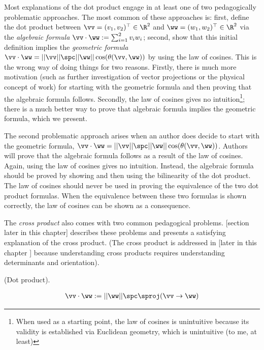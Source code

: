 Most explanations of the dot product engage in at least one of two pedagogically problematic approaches. The most common of these approaches is: first, define the dot product between $\vv = (v_1, v_2)^\top \in \R^2$ and $\ww = (w_1, w_2)^\top \in \R^2$ via the \textit{algebraic formula} $\vv \cdot \ww := \sum_{i = 1}^2 v_i w_i$;
second, show that this initial definition implies the \textit{geometric formula} $\vv \cdot \ww = ||\vv|| \spc ||\ww|| \cos(\theta(\vv, \ww))$ by using the law of cosines. This is the wrong way of doing things for two reasons. Firstly, there is much more motivation (such as further investigation of vector projections or the physical concept of work) for starting with the geometric formula and then proving that the algebraic formula follows. Secondly, the law of cosines gives no intuition\footnote{When used as a starting point, the law of cosines is unintuitive because its validity is established via Euclidean geometry, which is unintuitive (to me, at least)}; there is a much better way to prove that algebraic formula implies the geometric formula, which we present.

The second problematic approach arises when an author does decide to start with the geometric formula, $\vv \cdot \ww = ||\vv|| \spc ||\ww|| \cos(\theta(\vv, \ww))$. Authors will prove that the algebraic formula follows as a result of the law of cosines. Again, using the law of cosines gives no intuition. Instead, the algebraic formula should be proved by showing and then using the bilinearity of the dot product. The law of cosines should never
be used in proving the equivalence of the two dot product formulas. When the equivalence between these two formulas is shown correctly, the law of cosines can be shown as a consequence.

\vspace{.25cm}

The \textit{cross product} also comes with two common pedagogical problems. [section later in this chapter] describes these problems and presents a satisfying explanation of the cross product. (The cross product is addressed in [later in this chapter ] because understanding cross products requires understanding determinants and orientation).

\begin{defn}
    (Dot product).
    
    \begin{align*}
        \vv \cdot \ww := ||\ww|| \spc \sproj(\vv \rightarrow \ww)
    \end{align*}
\end{defn}

